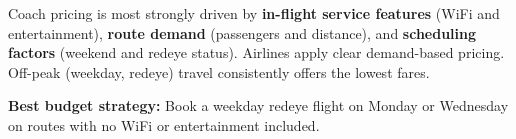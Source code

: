 \documentclass[12pt, a4paper]{report}
\begin{document}
\vspace{1em}
\begin{tcolorbox}[
  enhanced, colback=themeBlue!8, colframe=themeBlue,
  title={\textbf{Overall Conclusions}},
  fonttitle=\color{white}, coltitle=white,
  attach boxed title to top left={yshift=-2mm, xshift=4mm},
  boxed title style={colback=themeBlue}
]
Coach pricing is most strongly driven by \textbf{in-flight service features} (WiFi and entertainment), \textbf{route demand} (passengers and distance), and \textbf{scheduling factors} (weekend and redeye status). Airlines apply clear demand-based pricing. Off-peak (weekday, redeye) travel consistently offers the lowest fares.

\medskip
\textbf{Best budget strategy:} Book a weekday redeye flight on Monday or Wednesday on routes with no WiFi or entertainment included.
\end{tcolorbox}
\end{document}
